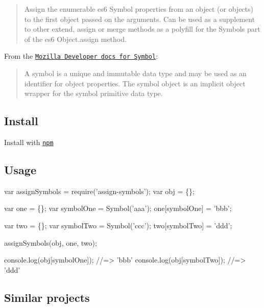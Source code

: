 \begin{quote}
Assign the enumerable es6 Symbol properties from an object (or objects) to the first object passed on the arguments. Can be used as a supplement to other extend, assign or merge methods as a polyfill for the Symbols part of the es6 Object.\+assign method. \end{quote}


From the \href{https://developer.mozilla.org/en-US/docs/Web/JavaScript/Reference/Global_Objects/Symbol}{\tt Mozilla Developer docs for Symbol}\+:

\begin{quote}
A symbol is a unique and immutable data type and may be used as an identifier for object properties. The symbol object is an implicit object wrapper for the symbol primitive data type. \end{quote}


\subsection*{Install}

Install with \href{https://www.npmjs.com/}{\tt npm}




\subsection*{Usage}


\begin{DoxyCode}
var assignSymbols = require('assign-symbols');
var obj = \{\};

var one = \{\};
var symbolOne = Symbol('aaa');
one[symbolOne] = 'bbb';

var two = \{\};
var symbolTwo = Symbol('ccc');
two[symbolTwo] = 'ddd';

assignSymbols(obj, one, two);

console.log(obj[symbolOne]);
//=> 'bbb'
console.log(obj[symbolTwo]);
//=> 'ddd'
\end{DoxyCode}


\subsection*{Similar projects}



